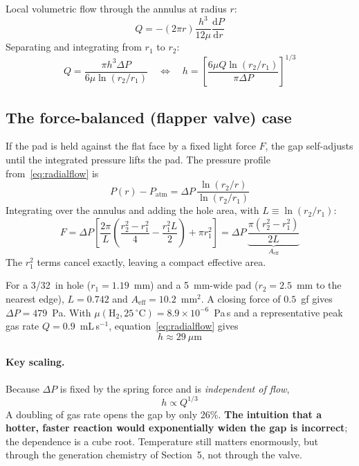 \documentclass[11pt,a4paper]{article}
\newcommand{\um}{\ensuremath{\mu\mathrm{m}}}
\begin{document}
Local volumetric flow through the annulus at radius $r$:
\begin{equation}
  Q = -(2\pi r)\frac{h^3}{12\mu}\frac{\mathrm{d}P}{\mathrm{d}r}
\end{equation}
Separating and integrating from $r_1$ to $r_2$:
\begin{equation}
  \boxed{\;
  Q = \frac{\pi h^3 \Delta P}{6\mu \ln(r_2/r_1)}
  \quad\Longleftrightarrow\quad
  h = \left[\frac{6\mu Q \ln(r_2/r_1)}{\pi \Delta P}\right]^{1/3}\;}
  \label{eq:radialflow}
\end{equation}

\subsection{The force-balanced (flapper valve) case}

If the pad is held against the flat face by a fixed light force $F$, the gap
self-adjusts until the integrated pressure lifts the pad. The pressure
profile from~\eqref{eq:radialflow} is
\begin{equation}
  P(r) - P_{\mathrm{atm}} = \Delta P\,
  \frac{\ln(r_2/r)}{\ln(r_2/r_1)}
\end{equation}
Integrating over the annulus and adding the hole area, with
$L \equiv \ln(r_2/r_1)$:
\begin{equation}
  F = \Delta P\left[\frac{2\pi}{L}
  \left(\frac{r_2^2 - r_1^2}{4} - \frac{r_1^2 L}{2}\right)
  + \pi r_1^2\right]
  = \Delta P\,\underbrace{\frac{\pi(r_2^2-r_1^2)}{2L}}_{A_{\mathrm{eff}}}
  \label{eq:aeff}
\end{equation}
The $r_1^2$ terms cancel exactly, leaving a compact effective area.

For a 3/32~in hole ($r_1 = 1.19$~mm) and a 5~mm-wide pad
($r_2 = 2.5$~mm to the nearest edge), $L = 0.742$ and
$A_{\mathrm{eff}} = 10.2$~mm$^2$. A closing force of $0.5$~gf gives
$\Delta P = 479$~Pa. With $\mu(\mathrm{H_2}, 25\,^\circ\mathrm{C})
= 8.9\times10^{-6}$~Pa\,s and a representative peak gas rate
$Q = 0.9$~mL\,s$^{-1}$, equation~\eqref{eq:radialflow} gives
\begin{equation}
  h \approx 29\ \um
\end{equation}

\paragraph{Key scaling.} Because $\Delta P$ is fixed by the spring force and
is \emph{independent of flow},
\begin{equation}
  h \propto Q^{1/3}
\end{equation}
A doubling of gas rate opens the gap by only 26\%. \textbf{The intuition
that a hotter, faster reaction would exponentially widen the gap is
incorrect}; the dependence is a cube root. Temperature still matters
enormously, but through the generation chemistry of Section~5, not through
the valve.
\end{document}
